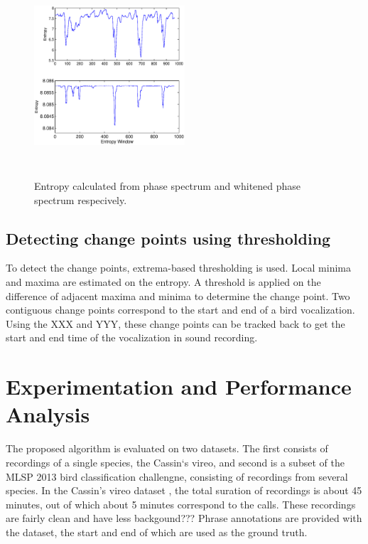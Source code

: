 \documentclass[a4paper]{article}
\begin{document}
\begin{figure}[h]
\centering
\includegraphics[width=0.5\textwidth,height=7.5cm]{Entropy_gd_white_non_white.eps}
\caption{Entropy calculated from phase spectrum and whitened phase spectrum respecively.}
\label{fig:entropy}
\end{figure}



\subsection{Detecting change points using thresholding}



   
To detect the change points, extrema-based thresholding is used. Local minima
and maxima are estimated on the entropy.  A threshold is applied on the
difference of adjacent maxima and minima to determine the change point. Two
contiguous change points correspond to the start and end of a bird vocalization.
Using the XXX and YYY, these change points can be tracked back to get the start
and end time of the vocalization in sound recording.
   
   
   




\section{Experimentation and Performance Analysis}
The proposed algorithm is evaluated on two datasets. The first consists of
recordings of a single species, the Cassin`s vireo, and second is a subset of
the MLSP 2013 bird classification challengne, consisting of recordings from several species. In
the Cassin's vireo dataset \cite{data1}, the total suration of recordings is about 45
minutes, out of which about 5 minutes correspond to the calls. These recordings
are fairly clean and have less backgound??? Phrase
annotations are provided with the dataset, the start and end of which are used
as the ground truth.
\end{document}
